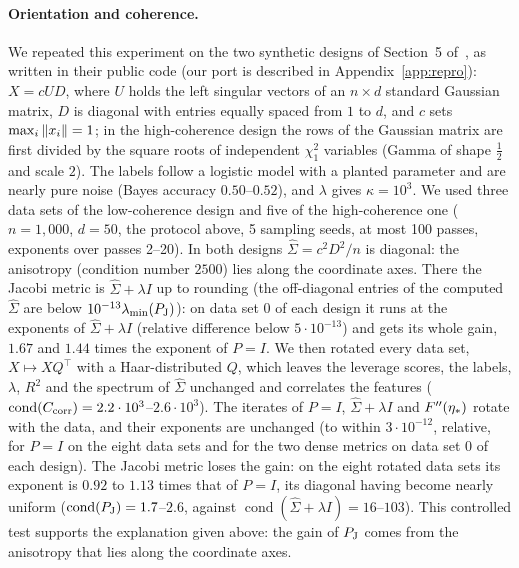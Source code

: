 \paragraph{Orientation and coherence.}
We repeated this experiment on the two synthetic designs of Section~5 of~\cite{na2023hessian}, as written in their
public code (our port is described in Appendix~\ref{app:repro}): $X=cUD$, where $U$ holds the left singular vectors of an
$n\times d$ standard Gaussian matrix, $D$ is diagonal with entries equally spaced from $1$ to $d$, and $c$ sets
$\max_i\left\|x_i\right\|=1$; in the high-coherence design the rows of the Gaussian matrix are first divided by the square roots
of independent $\chi^2_1$ variables (Gamma of shape $\frac12$ and scale $2$). The labels follow a logistic model with a
planted parameter and are nearly
pure noise (Bayes accuracy $0.50$--$0.52$), and $\lambda$ gives $\kappa=10^3$. We used three data sets of the
low-coherence design and five of the high-coherence one ($n=1{,}000$, $d=50$, the protocol above, 5 sampling seeds, at
most 100 passes, exponents over passes 2--20). In both designs $\hat\Sigma=c^2D^2/n$ is diagonal: the anisotropy
(condition number $2500$) lies along the coordinate axes. There the Jacobi metric is $\hat\Sigma+\lambda I$ up to
rounding (the off-diagonal entries of the computed $\hat\Sigma$ are below $10^{-13}\lambda_{\min}(P_{\rm J})$): on data set $0$
of each design it runs at the exponents of $\hat\Sigma+\lambda I$ (relative difference below $5\cdot10^{-13}$) and gets
its whole gain, $1.67$ and $1.44$ times the exponent of $P=I$. We then rotated every data set, $X\mapsto XQ^\top$ with a
Haar-distributed $Q$, which leaves the leverage scores, the labels, $\lambda$, $R^2$ and the spectrum of $\hat\Sigma$
unchanged and correlates the features ($\operatorname{cond}(C_{\rm corr})=2.2\cdot10^3$--$2.6\cdot10^3$). The iterates
of $P=I$, $\hat\Sigma+\lambda I$ and $F''(\eta_\ast)$ rotate with the data, and their exponents are unchanged (to within
$3\cdot10^{-12}$, relative, for $P=I$ on the eight data sets and for the two dense metrics on data set $0$ of each
design). The Jacobi metric loses the gain: on the eight rotated data sets its exponent is $0.92$ to $1.13$ times that of
$P=I$, its diagonal having become nearly uniform ($\operatorname{cond}(P_{\rm J})=1.7$--$2.6$, against
$\operatorname{cond}(\hat\Sigma+\lambda I)=16$--$103$). This controlled test supports the explanation given above: the
gain of $P_{\rm J}$ comes from the anisotropy that lies along the coordinate axes.

